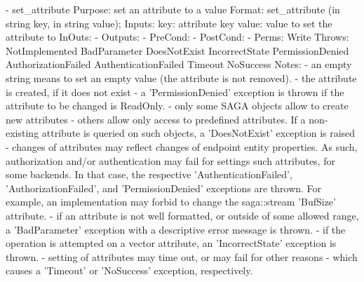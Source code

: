 \begin{myspec}
    - set_attribute
      Purpose:  set an attribute to a value
      Format:   set_attribute        (in string key,
                                      in string value);
      Inputs:   key:                  attribute key
                value:                value to set the
                                      attribute to
      InOuts:   -
      Outputs:  -
      PreCond:  -
      PostCond: -
      Perms:    Write
      Throws:   NotImplemented
                BadParameter
                DoesNotExist
                IncorrectState
                PermissionDenied
                AuthorizationFailed
                AuthenticationFailed
                Timeout
                NoSuccess
      Notes:    - an empty string means to set an empty value
                  (the attribute is not removed).
                - the attribute is created, if it does not exist
                - a 'PermissionDenied' exception is thrown if the
                  attribute to be changed is ReadOnly.
                - only some SAGA objects allow to create new
                  attributes - others allow only access to
                  predefined attributes.  If a non-existing
                  attribute is queried on such objects, a
                  'DoesNotExist' exception is raised
                - changes of attributes may reflect changes of
                  endpoint entity properties.  As such,
                  authorization and/or authentication may fail
                  for settings such attributes, for some
                  backends.  In that case, the respective
                  'AuthenticationFailed', 'AuthorizationFailed',
                  and 'PermissionDenied' exceptions are thrown.
                  For example, an implementation may forbid to
                  change the saga::stream 'BufSize' attribute.
                - if an attribute is not well formatted, or
                  outside of some allowed range, a 'BadParameter'
                  exception with a descriptive error message is
                  thrown.
                - if the operation is attempted on a vector
                  attribute, an 'IncorrectState' exception is
                  thrown.
                - setting of attributes may time out, or may fail
                  for other reasons - which causes a 'Timeout' or
                  'NoSuccess' exception, respectively.
 

\end{myspec}

